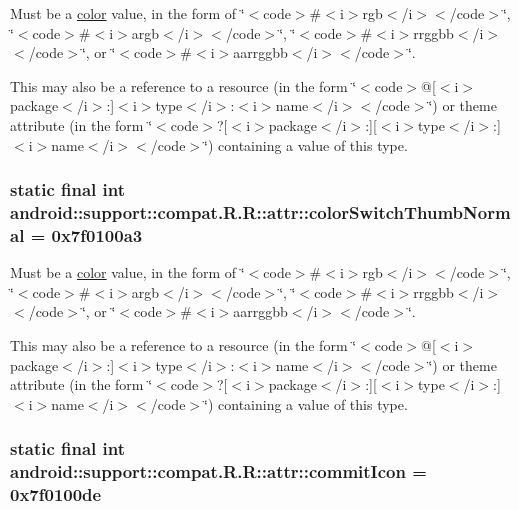 Must be a \hyperlink{classandroid_1_1support_1_1compat_1_1_r_1_1color}{color} value, in the form of \char`\"{}$<$code$>$\#$<$i$>$rgb$<$/i$>$$<$/code$>$\char`\"{}, \char`\"{}$<$code$>$\#$<$i$>$argb$<$/i$>$$<$/code$>$\char`\"{}, \char`\"{}$<$code$>$\#$<$i$>$rrggbb$<$/i$>$$<$/code$>$\char`\"{}, or \char`\"{}$<$code$>$\#$<$i$>$aarrggbb$<$/i$>$$<$/code$>$\char`\"{}. 

This may also be a reference to a resource (in the form \char`\"{}$<$code$>$@\mbox{[}$<$i$>$package$<$/i$>$:\mbox{]}$<$i$>$type$<$/i$>$:$<$i$>$name$<$/i$>$$<$/code$>$\char`\"{}) or theme attribute (in the form \char`\"{}$<$code$>$?\mbox{[}$<$i$>$package$<$/i$>$:\mbox{]}\mbox{[}$<$i$>$type$<$/i$>$:\mbox{]}$<$i$>$name$<$/i$>$$<$/code$>$\char`\"{}) containing a value of this type. \hypertarget{classandroid_1_1support_1_1compat_1_1_r_1_1attr_930c766820774497f0ff2061481708d6}{
\subsubsection[{colorSwitchThumbNormal}]{\setlength{\rightskip}{0pt plus 5cm}static final int android::support::compat.R.R::attr::colorSwitchThumbNormal = 0x7f0100a3}}
\label{classandroid_1_1support_1_1compat_1_1_r_1_1attr_930c766820774497f0ff2061481708d6}


Must be a \hyperlink{classandroid_1_1support_1_1compat_1_1_r_1_1color}{color} value, in the form of \char`\"{}$<$code$>$\#$<$i$>$rgb$<$/i$>$$<$/code$>$\char`\"{}, \char`\"{}$<$code$>$\#$<$i$>$argb$<$/i$>$$<$/code$>$\char`\"{}, \char`\"{}$<$code$>$\#$<$i$>$rrggbb$<$/i$>$$<$/code$>$\char`\"{}, or \char`\"{}$<$code$>$\#$<$i$>$aarrggbb$<$/i$>$$<$/code$>$\char`\"{}. 

This may also be a reference to a resource (in the form \char`\"{}$<$code$>$@\mbox{[}$<$i$>$package$<$/i$>$:\mbox{]}$<$i$>$type$<$/i$>$:$<$i$>$name$<$/i$>$$<$/code$>$\char`\"{}) or theme attribute (in the form \char`\"{}$<$code$>$?\mbox{[}$<$i$>$package$<$/i$>$:\mbox{]}\mbox{[}$<$i$>$type$<$/i$>$:\mbox{]}$<$i$>$name$<$/i$>$$<$/code$>$\char`\"{}) containing a value of this type. \hypertarget{classandroid_1_1support_1_1compat_1_1_r_1_1attr_0aff59d4ea0eeb7c612df306933a32b0}{
\subsubsection[{commitIcon}]{\setlength{\rightskip}{0pt plus 5cm}static final int android::support::compat.R.R::attr::commitIcon = 0x7f0100de}}
\label{classandroid_1_1support_1_1compat_1_1_r_1_1attr_0aff59d4ea0eeb7c612df306933a32b0}


